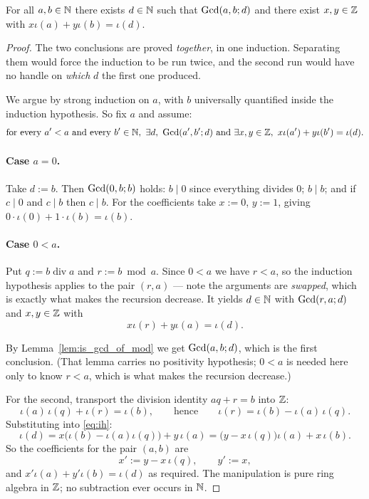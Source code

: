 \begin{theorem}
  \leanok
  \label{thm:exists_is_gcd_bezout}
  For all $a, b \in \mathbb{N}$ there exists $d \in \mathbb{N}$ such that $\mathrm{Gcd}(a,b;d)$ and
  there exist $x, y \in \mathbb{Z}$ with $x\iota(a) + y\iota(b) = \iota(d)$.
\end{theorem}
\begin{proof}
  \leanok
  The two conclusions are proved \emph{together}, in one induction. Separating
  them would force the induction to be run twice, and the second run would have
  no handle on \emph{which} $d$ the first one produced.

  We argue by strong induction on $a$, with $b$ universally quantified inside
  the induction hypothesis. So fix $a$ and assume:
  \[
    \text{for every } a' < a \text{ and every } b' \in \mathbb{N},\ \exists d,\ \mathrm{Gcd}(a',b';d)
    \ \text{and}\ \exists x, y \in \mathbb{Z},\ x\iota(a') + y\iota(b') = \iota(d).
  \]

  \paragraph{Case $a = 0$.} Take $d := b$. Then $\mathrm{Gcd}(0,b;b)$ holds: $b \mid 0$
  since everything divides $0$; $b \mid b$; and if $c \mid 0$ and $c \mid b$ then
  $c \mid b$. For the coefficients take $x := 0$, $y := 1$, giving
  $0 \cdot \iota(0) + 1 \cdot \iota(b) = \iota(b)$.

  \paragraph{Case $0 < a$.} Put $q := b \operatorname{div} a$ and
  $r := b \bmod a$. Since $0 < a$ we have $r < a$, so the induction hypothesis
  applies to the pair $(r, a)$ --- note the arguments are \emph{swapped}, which
  is exactly what makes the recursion decrease. It yields $d \in \mathbb{N}$ with
  $\mathrm{Gcd}(r,a;d)$ and $x, y \in \mathbb{Z}$ with
  \begin{equation}\label{eq:ih}
    x \iota(r) + y \iota(a) = \iota(d).
  \end{equation}

  By Lemma~\ref{lem:is_gcd_of_mod} we get $\mathrm{Gcd}(a,b;d)$, which is the first
  conclusion. (That lemma carries no positivity hypothesis; $0 < a$ is needed
  here only to know $r < a$, which is what makes the recursion decrease.)

  For the second, transport the division identity $a q + r = b$ into $\mathbb{Z}$:
  \[
    \iota(a)\,\iota(q) + \iota(r) = \iota(b),
    \qquad\text{hence}\qquad
    \iota(r) = \iota(b) - \iota(a)\,\iota(q).
  \]
  Substituting into \eqref{eq:ih}:
  \[
    \iota(d) = x\bigl(\iota(b) - \iota(a)\iota(q)\bigr) + y\,\iota(a)
             = \bigl(y - x\,\iota(q)\bigr)\iota(a) + x\,\iota(b).
  \]
  So the coefficients for the pair $(a, b)$ are
  \[
    x' := y - x\,\iota(q), \qquad y' := x ,
  \]
  and $x'\iota(a) + y'\iota(b) = \iota(d)$ as required. The manipulation is pure
  ring algebra in $\mathbb{Z}$; no subtraction ever occurs in $\mathbb{N}$.
\end{proof}

